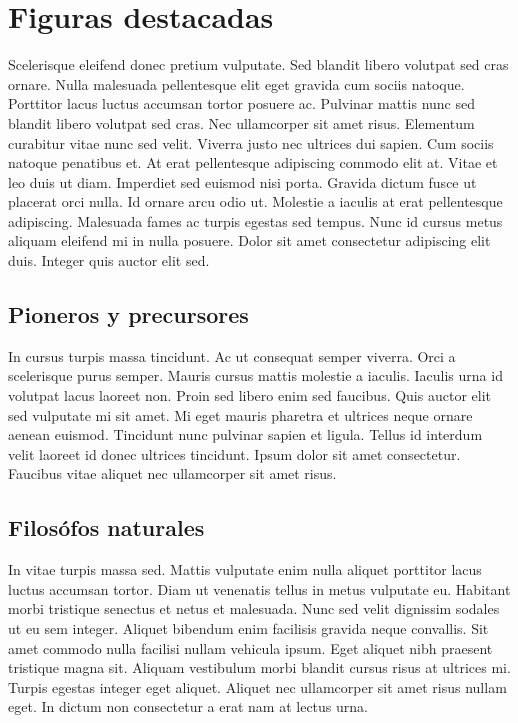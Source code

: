 \chapter{Figuras destacadas}
Scelerisque eleifend donec pretium vulputate. Sed blandit libero volutpat sed cras ornare. Nulla malesuada pellentesque elit eget gravida cum sociis natoque. Porttitor lacus luctus accumsan tortor posuere ac. Pulvinar mattis nunc sed blandit libero volutpat sed cras. Nec ullamcorper sit amet risus. Elementum curabitur vitae nunc sed velit. Viverra justo nec ultrices dui sapien. Cum sociis natoque penatibus et. At erat pellentesque adipiscing commodo elit at. Vitae et leo duis ut diam. Imperdiet sed euismod nisi porta. Gravida dictum fusce ut placerat orci nulla. Id ornare arcu odio ut. Molestie a iaculis at erat pellentesque adipiscing. Malesuada fames ac turpis egestas sed tempus. Nunc id cursus metus aliquam eleifend mi in nulla posuere. Dolor sit amet consectetur adipiscing elit duis. Integer quis auctor elit sed.

\section{Pioneros y precursores}
In cursus turpis massa tincidunt. Ac ut consequat semper viverra. Orci a scelerisque purus semper. Mauris cursus mattis molestie a iaculis. Iaculis urna id volutpat lacus laoreet non. Proin sed libero enim sed faucibus. Quis auctor elit sed vulputate mi sit amet. Mi eget mauris pharetra et ultrices neque ornare aenean euismod. Tincidunt nunc pulvinar sapien et ligula. Tellus id interdum velit laoreet id donec ultrices tincidunt. Ipsum dolor sit amet consectetur. Faucibus vitae aliquet nec ullamcorper sit amet risus.

\section{Filosófos naturales}
In vitae turpis massa sed. Mattis vulputate enim nulla aliquet porttitor lacus luctus accumsan tortor. Diam ut venenatis tellus in metus vulputate eu. Habitant morbi tristique senectus et netus et malesuada. Nunc sed velit dignissim sodales ut eu sem integer. Aliquet bibendum enim facilisis gravida neque convallis. Sit amet commodo nulla facilisi nullam vehicula ipsum. Eget aliquet nibh praesent tristique magna sit. Aliquam vestibulum morbi blandit cursus risus at ultrices mi. Turpis egestas integer eget aliquet. Aliquet nec ullamcorper sit amet risus nullam eget. In dictum non consectetur a erat nam at lectus urna.

